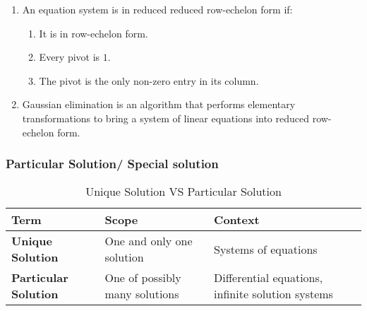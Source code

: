 \begin{enumerate}[itemsep=0.2cm]
    \item An equation system is in reduced reduced row-echelon form if:
    \begin{enumerate}
        \item It is in row-echelon form.
        \hfill \cite{mfml/book/mml/Deisenroth-Faisal-Ong}
    
        \item Every pivot is $1$.
        \hfill \cite{mfml/book/mml/Deisenroth-Faisal-Ong}
    
        \item The pivot is the only non-zero entry in its column.
        \hfill \cite{mfml/book/mml/Deisenroth-Faisal-Ong}
    \end{enumerate}

    \item Gaussian elimination is an algorithm that performs elementary transformations to bring a system of linear equations into reduced row-echelon form.
    \hfill \cite{mfml/book/mml/Deisenroth-Faisal-Ong}
\end{enumerate}










\subsubsection{Particular Solution/ Special solution}

\begin{customArrayStretch}{1.3}
\begin{table}[H]
    \centering
    \begin{tabular}{|l|l|l|}
        \hline
        \textbf{Term} & 
            \textbf{Scope} & 
            \textbf{Context} \\ \hline \hline
        
        \textbf{Unique Solution} & 
            One and only one solution & 
            Systems of equations \\ \hline

        \textbf{Particular Solution} & 
            One of possibly many solutions & 
            Differential equations, infinite solution systems \\ \hline

    \end{tabular}
    \caption*{Unique Solution VS Particular Solution \cite{common/online/chatgpt}}
\end{table}
\end{customArrayStretch}



